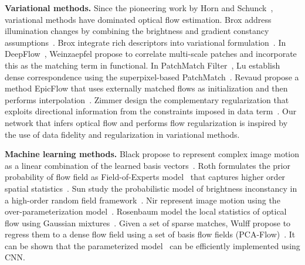 \documentclass[10pt,twocolumn,letterpaper]{article}
\begin{document}
\vspace{0.1cm}
\noindent \textbf{Variational methods.} Since the pioneering work by Horn and Schunck~\cite{Horn81}, variational methods have dominated optical flow estimation. Brox \etal address illumination changes by combining the brightness and gradient constancy assumptions~\cite{Brox04}. Brox \etal integrate rich descriptors into variational formulation~\cite{Brox11}. In DeepFlow~\cite{Weinzaepfel13}, Weinzaepfel \etal propose to correlate multi-scale patches and incorporate this as the matching term in functional. In PatchMatch Filter~\cite{Lu13}, Lu \etal establish dense correspondence using the superpixel-based PatchMatch~\cite{Barnes09}. Revaud \etal propose a method EpicFlow that uses externally matched flows as initialization and then performs interpolation~\cite{Revaud15}. Zimmer \etal design the complementary regularization that exploits directional information from the constraints imposed in data term~\cite{Zimmer11}. Our network that infers optical flow and performs flow regularization is inspired by the use of data fidelity and regularization in variational methods. 

\vspace{0.1cm}
\noindent \textbf{Machine learning methods.} Black \etal propose to represent complex image motion as a linear combination of the learned basis vectors~\cite{Black97}. Roth \etal formulates the prior probability of flow field as Field-of-Experts model~\cite{Roth05a} that captures higher order spatial statistics~\cite{Roth05b}. Sun \etal study the probabilistic model of brightness inconstancy in a high-order random field framework~\cite{Sun08}. Nir \etal represent image motion using the over-parameterization model~\cite{Nir08}. Rosenbaum \etal model the local statistics of optical flow using Gaussian mixtures~\cite{Rosenbaum13}. Given a set of sparse matches, Wulff \etal propose to regress them to a dense flow field using a set of basis flow fields (PCA-Flow)~\cite{Wulff15}. It can be shown that the parameterized model~\cite{Black97, Nir08, Wulff15} can be efficiently implemented using CNN.
\end{document}
